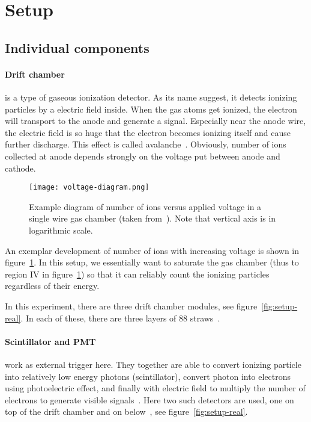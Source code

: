 \clearpage
\section{Setup}\label{sec:setup}

\subsection{Individual components}
\paragraph{Drift chamber}
is a type of gaseous ionization detector. As its name suggest, it detects ionizing particles by a electric field inside. When the gas atoms get ionized, the electron will transport to the anode and generate a signal. Especially near the anode wire, the electric field is so huge that the electron becomes ionizing itself and cause further discharge. This effect is called avalanche~\cite{leo}. Obviously, number of ions collected at anode depends strongly on the voltage put between anode and cathode.

\begin{figure}[htpb]
	\centering
	\texttt{[image: voltage-diagram.png]}
	\caption{Example diagram of number of ions versus applied voltage in a single wire gas chamber (taken from~\cite{leo}). Note that vertical axis is in logarithmic scale. }%
	\label{fig:voltage-diagram}
\end{figure}
An exemplar development of number of ions with increasing voltage is shown in figure~\ref{fig:voltage-diagram}. In this setup, we essentially want to saturate the gas chamber (thus to region IV in figure~\ref{fig:voltage-diagram}) so that it can reliably count the ionizing particles regardless of their energy.

In this experiment, there are three drift chamber modules, see figure~\ref{fig:setup-real}. In each of these, there are three layers of $88$ straws~\cite{manual}.

\paragraph{Scintillator and PMT}
work as external trigger here. They together are able to convert ionizing particle into relatively low energy photons (scintillator), convert photon into electrons using photoelectric effect, and finally with electric field to multiply the number of electrons to generate visible signals~\cite{wermes}. Here two such detectors are used, one on top of the drift chamber and on below~\cite{manual}, see figure~\ref{fig:setup-real}.

